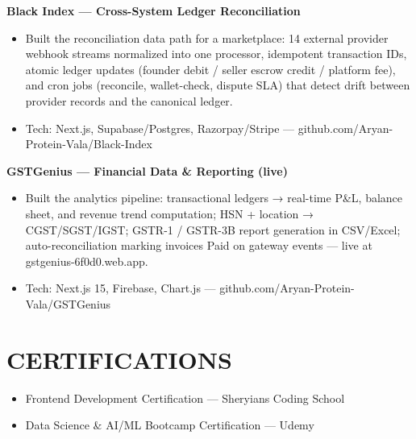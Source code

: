 \documentclass[9pt]{article}
\begin{document}
\textbf{Black Index  ---  Cross-System Ledger Reconciliation}
\vspace{1pt}
\begin{itemize}[leftmargin=11pt,itemsep=0pt,topsep=1pt,parsep=0pt]
\item Built the reconciliation data path for a marketplace: 14 external provider webhook streams normalized into one processor, idempotent transaction IDs, atomic ledger updates (founder debit / seller escrow credit / platform fee), and cron jobs (reconcile, wallet-check, dispute SLA) that detect drift between provider records and the canonical ledger.
\item Tech: Next.js, Supabase/Postgres, Razorpay/Stripe  ---  github.com/Aryan-Protein-Vala/Black-Index
\end{itemize}
\textbf{GSTGenius  ---  Financial Data \& Reporting (live)}
\vspace{1pt}
\begin{itemize}[leftmargin=11pt,itemsep=0pt,topsep=1pt,parsep=0pt]
\item Built the analytics pipeline: transactional ledgers → real-time P\&L, balance sheet, and revenue trend computation; HSN + location → CGST/SGST/IGST; GSTR-1 / GSTR-3B report generation in CSV/Excel; auto-reconciliation marking invoices Paid on gateway events  ---  live at gstgenius-6f0d0.web.app.
\item Tech: Next.js 15, Firebase, Chart.js  ---  github.com/Aryan-Protein-Vala/GSTGenius
\end{itemize}
\section*{CERTIFICATIONS}
\begin{itemize}[leftmargin=11pt,itemsep=0pt,topsep=1pt,parsep=0pt]
\item Frontend Development Certification  ---  Sheryians Coding School
\item Data Science \& AI/ML Bootcamp Certification  ---  Udemy
\end{itemize}
\end{document}
